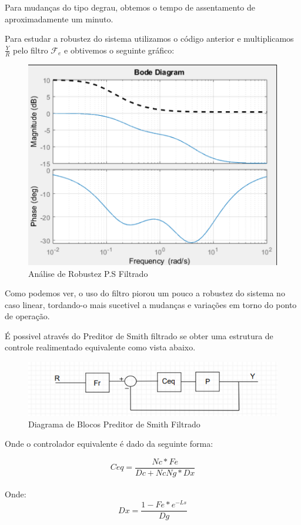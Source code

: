 \documentclass[a4paper,12pt]{article}
\begin{document}
Para mudanças do tipo degrau, obtemos o tempo de assentamento de
aproximadamente um minuto.


Para estudar a robustez do sistema utilizamos o código anterior e multiplicamos \(\frac{Y}{R}\) pelo filtro \(\mathcal{F}_e\) e obtivemos o seguinte gráfico:


\begin{figure} [H]
    \centering
    \includegraphics[width=0.6\linewidth]{image9.png}
    \caption{Análise de Robustez P.S Filtrado}
    \label{fig:enter-label}
\end{figure}

Como podemos ver, o uso do filtro piorou um pouco a robustez do sistema no caso linear, tordando-o mais sucetivel a mudanças e variações em torno do ponto de operação.

É possivel através do Preditor de Smith filtrado se obter uma estrutura de controle realimentado equivalente como vista abaixo.

\begin{figure} [H]
    \centering
    \includegraphics[width=0.9\linewidth]{image10.png}
    \caption{Diagrama de Blocos Preditor de Smith Filtrado}
    \label{fig:enter-label}
\end{figure}

Onde o controlador equivalente é dado da seguinte forma:

\begin{equation} 
Ceq = \frac{Nc*Fe}{Dc+NcNg*Dx} 
\end{equation}\\
Onde:\\
\begin{equation} 
Dx = \frac{1-Fe*e^{-Ls}}{Dg}
\end{equation}\\
\end{document}

